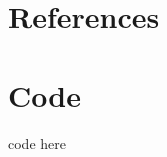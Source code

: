 \documentclass[pdftex,12pt,a4paper]{report}
\begin{document}
\deckblatt

\erklaerung



\tableofcontents









\appendix

\chapter{References}

\listoffigures

\begingroup
\let\clearpage\relax
\listoftables
\endgroup



\chapter{Code}

code here
\end{document}
